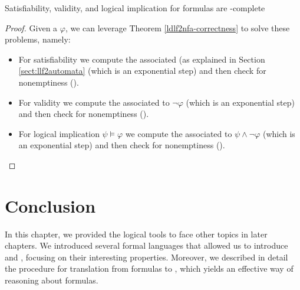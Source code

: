 \begin{theorem} Satisfiability, validity, and logical implication for \LDLf formulas are \PSPACE-complete
\end{theorem}
\begin{proof}
	Given a \LLf $\varphi$, we can leverage Theorem \ref{ldlf2nfa-correctness} to solve these problems, namely:
	\begin{itemize}
		\item For \LLf satisfiability we compute the associated \NFA (as explained in Section \ref{sect:llf2automata} (which is an exponential step) and then check \NFA for nonemptiness (\NLOGSPACE).
		\item For \LLf validity we compute the \NFA associated to $\lnot \varphi$ (which is an exponential step) and then check \NFA for nonemptiness (\NLOGSPACE).
		\item For \LLf logical implication $\psi \models \varphi$ we compute the \NFA associated to $\psi \wedge \lnot \varphi$ (which is an exponential step) and then check \NFA for nonemptiness (\NLOGSPACE).
	\end{itemize}
\end{proof}


\section{Conclusion}
In this chapter, we provided the logical tools to face other topics in later chapters. We introduced several formal languages that allowed us to introduce \LTLf and \LDLf, focusing on their interesting properties. Moreover, we described in detail the procedure for translation from \LLf formulas to \DFAs, which yields an effective way of reasoning about \LLf formulas.
